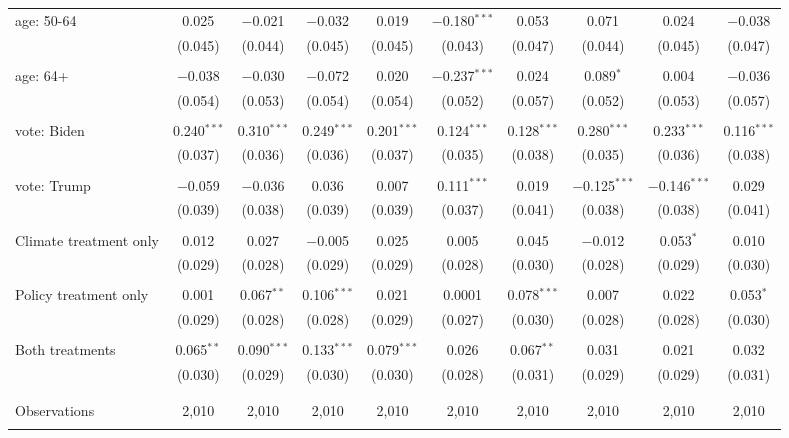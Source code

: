 \begin{tabular}{@{\extracolsep{5pt}}lccccccccc}
 age: 50-64 & 0.025 & $-$0.021 & $-$0.032 & 0.019 & $-$0.180$^{***}$ & 0.053 & 0.071 & 0.024 & $-$0.038 \\ 
  & (0.045) & (0.044) & (0.045) & (0.045) & (0.043) & (0.047) & (0.044) & (0.045) & (0.047) \\ 
  & & & & & & & & & \\ 
 age: 64+ & $-$0.038 & $-$0.030 & $-$0.072 & 0.020 & $-$0.237$^{***}$ & 0.024 & 0.089$^{*}$ & 0.004 & $-$0.036 \\ 
  & (0.054) & (0.053) & (0.054) & (0.054) & (0.052) & (0.057) & (0.052) & (0.053) & (0.057) \\ 
  & & & & & & & & & \\ 
 vote: Biden & 0.240$^{***}$ & 0.310$^{***}$ & 0.249$^{***}$ & 0.201$^{***}$ & 0.124$^{***}$ & 0.128$^{***}$ & 0.280$^{***}$ & 0.233$^{***}$ & 0.116$^{***}$ \\ 
  & (0.037) & (0.036) & (0.036) & (0.037) & (0.035) & (0.038) & (0.035) & (0.036) & (0.038) \\ 
  & & & & & & & & & \\ 
 vote: Trump & $-$0.059 & $-$0.036 & 0.036 & 0.007 & 0.111$^{***}$ & 0.019 & $-$0.125$^{***}$ & $-$0.146$^{***}$ & 0.029 \\ 
  & (0.039) & (0.038) & (0.039) & (0.039) & (0.037) & (0.041) & (0.038) & (0.038) & (0.041) \\ 
  & & & & & & & & & \\ 
 Climate treatment only & 0.012 & 0.027 & $-$0.005 & 0.025 & 0.005 & 0.045 & $-$0.012 & 0.053$^{*}$ & 0.010 \\ 
  & (0.029) & (0.028) & (0.029) & (0.029) & (0.028) & (0.030) & (0.028) & (0.029) & (0.030) \\ 
  & & & & & & & & & \\ 
 Policy treatment only & 0.001 & 0.067$^{**}$ & 0.106$^{***}$ & 0.021 & 0.0001 & 0.078$^{***}$ & 0.007 & 0.022 & 0.053$^{*}$ \\ 
  & (0.029) & (0.028) & (0.028) & (0.029) & (0.027) & (0.030) & (0.028) & (0.028) & (0.030) \\ 
  & & & & & & & & & \\ 
 Both treatments & 0.065$^{**}$ & 0.090$^{***}$ & 0.133$^{***}$ & 0.079$^{***}$ & 0.026 & 0.067$^{**}$ & 0.031 & 0.021 & 0.032 \\ 
  & (0.030) & (0.029) & (0.030) & (0.030) & (0.028) & (0.031) & (0.029) & (0.029) & (0.031) \\ 
  & & & & & & & & & \\ 
\hline \\[-1.8ex] 

Observations & 2,010 & 2,010 & 2,010 & 2,010 & 2,010 & 2,010 & 2,010 & 2,010 & 2,010 \\ 
\hline 
\hline \\[-1.8ex] 
\end{tabular} 